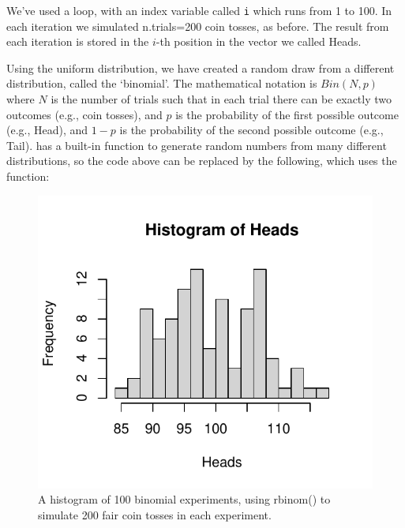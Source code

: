 We've used a  loop, with an index variable called \texttt{i} which runs from 1 to 100. In each iteration we simulated n.trials=200 coin tosses, as before. The result from each iteration is stored in the $i$-th position in the vector we called Heads.

Using the uniform distribution, we have created a random draw from a different distribution, called the `binomial'. The mathematical notation is $Bin(N, p)$ where $N$ is the number of trials such that in each trial there can be exactly two outcomes (e.g., coin tosses), and $p$ is the probability of the first possible outcome (e.g., Head), and $1-p$ is the probability of the second possible outcome (e.g., Tail).
\R has a built-in function to generate random numbers from many different distributions, so the code above can be replaced by the following, which uses the  function:
\begin{knitrout}
\color{fgcolor}\begin{kframe}
\begin{alltt}
\hlstd{(}\hlstd{)}
 \hlkwb{<-} 
 \hlkwb{<-} 
 \hlkwb{<-}  \hlstd{)}
 \hlstd{=}\hlstd{)}
\end{alltt}
\end{kframe}\begin{figure}

{\centering \includegraphics[width=\maxwidth]{figure/intro-binomial-1} 

}

\caption[A histogram of 100 binomial experiments, using rbinom() to simulate 200 fair coin tosses in each experiment]{A histogram of 100 binomial experiments, using rbinom() to simulate 200 fair coin tosses in each experiment.}\label{fig:intro-binomial}
\end{figure}

\end{knitrout}



